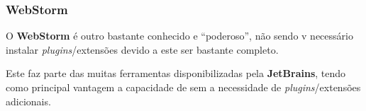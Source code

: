 \subsubsection{WebStorm}

\begin{minipage}{.3\textwidth}
\end{minipage}
\begin{minipage}{.7\textwidth}
	\minipagerestore
	O \textbf{WebStorm} é outro  bastante conhecido e ``poderoso'', não sendo v		necessário instalar \textit{plugins}/extensões devido a este ser bastante completo.

	Este  faz parte das muitas ferramentas disponibilizadas pela \textbf{JetBrains}, tendo como principal vantagem a capacidade de \textit{} sem a necessidade de \textit{plugins}/extensões adicionais.

\end{minipage}

